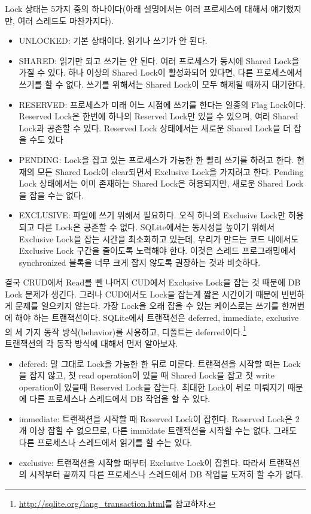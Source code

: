 Lock 상태는 5가지 중의 하나이다(아래 설명에서는 여러 프로세스에 대해서 얘기했지만, 여러 스레드도 마찬가지다).
\begin{itemize}
\item UNLOCKED: 기본 상태이다. 읽기나 쓰기가 안 된다.
\item SHARED: 읽기만 되고 쓰기는 안 된다. 여러 프로세스가 동시에 Shared Lock을 가질 수 있다. 하나 이상의 Shared Lock이 활성화되어 있다면, 다른 프로세스에서 쓰기를 할 수 없다. 쓰기를 위해서는 Shared Lock이 모두 해제될 때까지 대기한다.
\item RESERVED: 프로세스가 미래 어느 시점에 쓰기를 한다는 일종의 Flag Lock이다. Reserved Lock은 한번에 하나의 Reserved Lock만 있을 수 있으며, 여러 Shared Lock과 공존할 수 있다. Reserved Lock 상태에서는 새로운 Shared Lock을 더 잡을 수도 있다 
\item PENDING: Lock을 잡고 있는 프로세스가 가능한 한 빨리 쓰기를 하려고 한다. 현재의 모든 Shared Lock이 clear되면서 Exclusive Lock을 가지려고 한다. Pending Lock 상태에서는 이미 존재하는 Shared Lock은 허용되지만, 새로운 Shared Lock을 잡을 수는 없다. 
\item EXCLUSIVE: 파일에 쓰기 위해서 필요하다. 오직 하나의 Exclusive Lock만 허용되고 다른 Lock은 공존할 수 없다. SQLite에서는 동시성을 높이기 위해서 Exclusive Lock을 잡는 시간을 최소화하고 있는데, 우리가 만드는 코드 내에서도 Exclusive Lock 구간을 줄이도록 노력해야 한다. 이것은 스레드 프로그래밍에서 synchronized 블록을 너무 크게 잡지 않도록 권장하는 것과 비슷하다. \\
\end{itemize}

결국 CRUD에서 Read를 뺀 나머지 CUD에서 Exclusive Lock을 잡는 것 때문에 DB Lock 문제가 생긴다. 그러나 CUD에서도 Lock을 잡는게 짧은 시간이기 때문에 빈번하게 문제를 일으키지 않는다. 가장 Lock을 오래 잡을 수 있는 케이스로는 쓰기를 한꺼번에 해야 하는 트랜잭션이다.
SQLite에서 트랜잭션은 deferred, immediate, exclusive의 세 가지 동작 방식(behavior)를 사용하고, 디폴트는 deferred이다.\footnote{\url{http://sqlite.org/lang\_transaction.html}를 참고하자.}\\

트랜잭션의 각 동작 방식에 대해서 먼저 알아보자.
\begin{itemize}
\item defered: 말 그대로 Lock을 가능한 한 뒤로 미룬다. 트랜잭션을 시작할 때는 Lock을 잡지 않고, 첫 read operation이 있을 때 Shared Lock을 잡고 첫 write operation이 있을때 Reserved Lock을 잡는다. 최대한 Lock이 뒤로 미뤄지기 때문에 다른 프로세스나 스레드에서 DB 작업을 할 수 있다. 
\item immediate: 트랜잭션을 시작할 때 Reserved Lock이 잡힌다. Reserved Lock은 2개 이상 잡힐 수 없으므로, 다른 immidate 트랜잭션을 시작할 수는 없다. 그래도 다른 프로세스나 스레드에서 읽기를 할 수는 있다.
\item exclusive: 트랜잭션을 시작할 때부터 Exclusive Lock이 잡힌다. 따라서 트랜잭션의 시작부터 끝까지 다른 프로세스나 스레드에서 DB 작업을 도저히 할 수가 없다.
\end{itemize}

